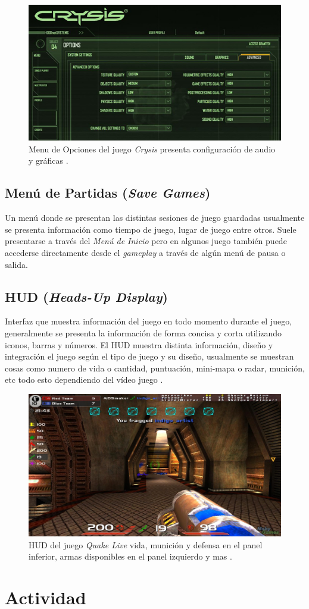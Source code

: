 \begin{figure}[H]
\centering
\includegraphics[width=0.95\linewidth]{media/crysis_opmenu.jpg} 
\caption{Menu de Opciones del juego \emph{Crysis} presenta configuración de audio y gráficas \cite{crysis}.}
\end{figure}

\subsection{Menú de Partidas (\emph{Save Games})}
Un menú donde se presentan las distintas sesiones de juego guardadas usualmente se presenta información como tiempo de juego, lugar de juego entre otros. Suele presentarse a través del \emph{Menú de Inicio} pero en algunos juego también puede accederse directamente desde el \emph{gameplay} a través de algún menú de pausa o salida.

\subsection{HUD (\emph{Heads-Up Display})}
Interfaz que muestra información del juego en todo momento durante el juego, generalmente se presenta la información de forma concisa y corta utilizando iconos, barras y números. El HUD muestra distinta información, diseño y integración el juego según el tipo de juego y su diseño, usualmente se muestran cosas como numero de vida o cantidad, puntuación, mini-mapa o radar, munición, etc todo esto dependiendo del vídeo juego \cite{huds}.

\begin{figure}[H]
\centering
\includegraphics[width=0.95\linewidth]{media/quake_live.jpg} 
\caption{HUD del juego \emph{Quake Live} vida, munición y defensa en el panel inferior, armas disponibles en el panel izquierdo y mas \cite{quake_live}.}
\end{figure}

\section{Actividad}
